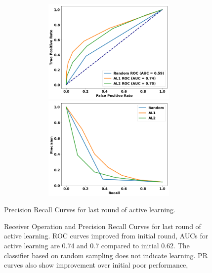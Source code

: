 \begin{figure}
\centering
\begin{minipage}[b]{.4\textwidth}
\includegraphics[trim=0in 0.1in 0.1in 0.in,clip,width=1.0\textwidth,height=2in]{figures/rocs_round5.png}
\captionsetup{labelformat=empty}
\caption{Receiver Operating Characteristic curve for last round of active learning. 
}\label{fig:rocs_round5}
\end{minipage}\qquad
\begin{minipage}[b]{.4\textwidth}
\includegraphics[trim=0in 0.1in 0.1in 0.in,clip,width=1.0\textwidth,height=2in]{figures/prcs_round5.png}
\captionsetup{labelformat=empty}
\caption{Precision Recall Curves for last round of active learning.}\label{fig:prcs_round5}
\end{minipage}
\setcounter{figure}{8}  
\caption{Receiver Operation and Precision Recall Curves for last round of active learning. 
ROC curves improved from initial round, AUCs for active learning are 0.74 and 0.7 compared to initial 0.62. The classifier based on random sampling does not indicate learning. PR curves also show improvement over initial poor performance,
}
\end{figure}

